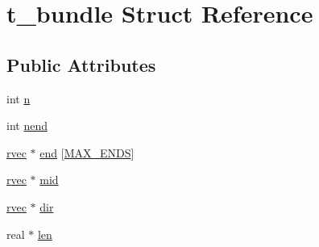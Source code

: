 \hypertarget{structt__bundle}{\section{t\-\_\-bundle \-Struct \-Reference}
\label{structt__bundle}
}
\subsection*{\-Public \-Attributes}
\begin{DoxyCompactItemize}
\item 
int \hyperlink{structt__bundle_ac1e205d5efd122bdcfa79e7ec10f8e5f}{n}
\item 
int \hyperlink{structt__bundle_a854e3f8c8e574ac252fb8d10f9cdc4e8}{nend}
\item 
\hyperlink{share_2template_2gromacs_2types_2simple_8h_aa02a552a4abd2f180c282a083dc3a999}{rvec} $\ast$ \hyperlink{structt__bundle_a3226b904719767ec53c2afa216920660}{end} \mbox{[}\hyperlink{gmx__bundle_8c_aa4158ef7afca4cd5d8c709bf94b3d378}{\-M\-A\-X\-\_\-\-E\-N\-D\-S}\mbox{]}
\item 
\hyperlink{share_2template_2gromacs_2types_2simple_8h_aa02a552a4abd2f180c282a083dc3a999}{rvec} $\ast$ \hyperlink{structt__bundle_a129bf541e14658ff99557f91ccfbea84}{mid}
\item 
\hyperlink{share_2template_2gromacs_2types_2simple_8h_aa02a552a4abd2f180c282a083dc3a999}{rvec} $\ast$ \hyperlink{structt__bundle_ace6892cb92fc936d3d3ee730838e67ca}{dir}
\item 
real $\ast$ \hyperlink{structt__bundle_a4c057b243caa2cb07af8ce886e6d3fcc}{len}
\end{DoxyCompactItemize}


